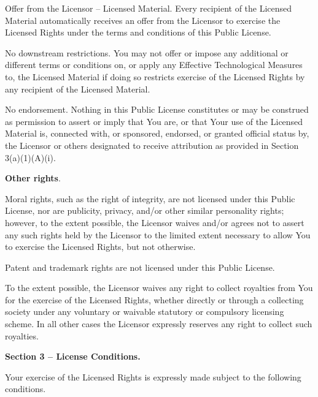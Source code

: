 \begin{doclicense@enumerate}
\begin{doclicense@enumerate}
\begin{doclicense@enumerate}
\item Offer from the Licensor – Licensed Material. Every recipient of the Licensed Material automatically receives an offer from the Licensor to exercise the Licensed Rights under the terms and conditions of this Public License.
\item No downstream restrictions. You may not offer or impose any additional or different terms or conditions on, or apply any Effective Technological Measures to, the Licensed Material if doing so restricts exercise of the Licensed Rights by any recipient of the Licensed Material.
\end{doclicense@enumerate}
 
\item No endorsement. Nothing in this Public License constitutes or may be construed as permission to assert or imply that You are, or that Your use of the Licensed Material is, connected with, or sponsored, endorsed, or granted official status by, the Licensor or others designated to receive attribution as provided in Section 3(a)(1)(A)(i).
\end{doclicense@enumerate}
\item \par \textbf{Other rights}.
\begin{doclicense@enumerate}
\item Moral rights, such as the right of integrity, are not licensed under this Public License, nor are publicity, privacy, and/or other similar personality rights; however, to the extent possible, the Licensor waives and/or agrees not to assert any such rights held by the Licensor to the limited extent necessary to allow You to exercise the Licensed Rights, but not otherwise.
\item Patent and trademark rights are not licensed under this Public License.
\item To the extent possible, the Licensor waives any right to collect royalties from You for the exercise of the Licensed Rights, whether directly or through a collecting society under any voluntary or waivable statutory or compulsory licensing scheme. In all other cases the Licensor expressly reserves any right to collect such royalties.
\end{doclicense@enumerate}

\end{doclicense@enumerate}
\par \textbf{Section 3 – License Conditions.}
\par Your exercise of the Licensed Rights is expressly made subject to the following conditions.
